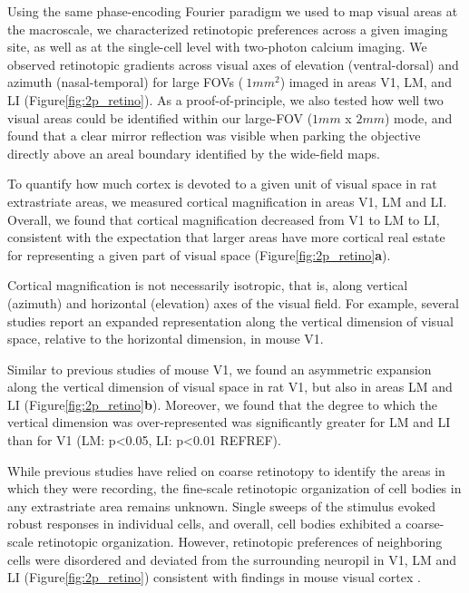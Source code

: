 Using the same phase-encoding Fourier paradigm we used to map visual areas at the macroscale, we characterized retinotopic preferences across a given imaging site, as well as at the single-cell level with two-photon calcium imaging. We observed retinotopic gradients across visual axes of elevation (ventral-dorsal) and azimuth (nasal-temporal) for large FOVs ($~1mm^2$) imaged in areas V1, LM, and LI (Figure\ref{fig:2p_retino}). As a proof-of-principle, we also tested how well two visual areas could be identified within our large-FOV ($1mm$ x $2mm$) mode, and found that a clear mirror reflection was visible when parking the objective directly above an areal boundary identified by the wide-field maps. 

To quantify how much cortex is devoted to a given unit of visual space in rat extrastriate areas, we measured cortical magnification in areas V1, LM and LI. Overall, we found that cortical magnification decreased from V1 to LM to LI, consistent with the expectation that larger areas have more cortical real estate for representing a given part of visual space (Figure\ref{fig:2p_retino}\textbf{a}). 

Cortical magnification is not necessarily isotropic, that is, along vertical (azimuth) and horizontal (elevation) axes of the visual field. For example, several studies report an expanded representation along the vertical dimension of visual space, relative to the horizontal dimension, in mouse V1\cite{Garrett2014, Liang2018, Bonin2011}.  

Similar to previous studies of mouse V1, we found an asymmetric expansion along the vertical dimension of visual space in rat V1, but also in areas LM and LI (Figure\ref{fig:2p_retino}\textbf{b}). Moreover, we found that the degree to which the vertical dimension was over-represented was significantly greater for LM and LI than for V1 (LM: p<0.05, LI: p<0.01 REFREF).

While previous studies have relied on coarse retinotopy to identify the areas in which they were recording, the fine-scale retinotopic organization of cell bodies in any extrastriate area remains unknown. Single sweeps of the stimulus evoked robust responses in individual cells, and overall, cell bodies exhibited a coarse-scale retinotopic organization. However, retinotopic preferences of neighboring cells were disordered and deviated from the surrounding neuropil in V1, LM and LI (Figure\ref{fig:2p_retino}) consistent with findings in mouse visual cortex \cite{Liang2018, Andermann2011, Marques2018}. 

